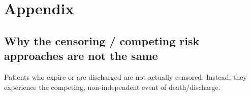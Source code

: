 \documentclass[
  10pt,
  a4paper,
]{article}
\begin{document}
\renewcommand{\thesection}{\Alph{section}}
\setcounter{section}{0}

\hypertarget{appendix}{%
\section{Appendix}\label{appendix}}

\hypertarget{why-the-censoring-competing-risk-approaches-are-not-the-same}{%
\subsection{Why the censoring / competing risk approaches are not the
same}\label{why-the-censoring-competing-risk-approaches-are-not-the-same}}

Patients who expire or are discharged are not actually censored.
Instead, they experience the competing, non-independent event of
death/discharge.
\end{document}
